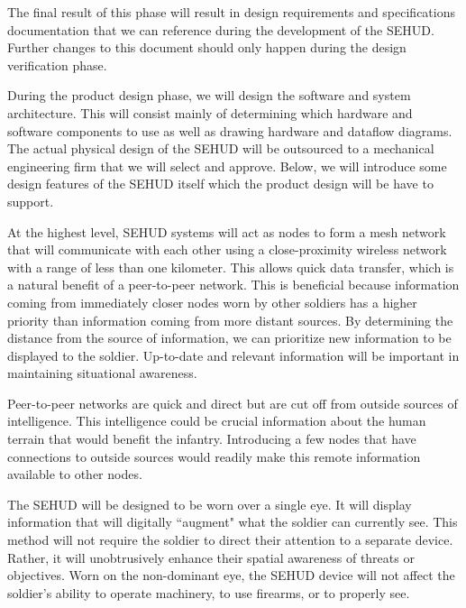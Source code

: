 The final result of this phase will result in design requirements and
specifications documentation that we can reference during the development of
the SEHUD. Further changes to this document should only happen during the
design verification phase.


During the product design phase, we will design the software and system
architecture. This will consist mainly of determining which hardware and
software components to use as well as drawing hardware and dataflow diagrams.
The actual physical design of the SEHUD will be outsourced to a mechanical
engineering firm that we will select and approve. Below, we will introduce
some design features of the SEHUD itself which the product design will be
have to support.

At the highest level, SEHUD systems will act as nodes to form a mesh network
that will communicate with each other using a close-proximity wireless
network with a range of less than one kilometer. This allows quick data
transfer, which is a natural benefit of a peer-to-peer network. This is
beneficial because information coming from immediately closer nodes worn by
other soldiers has a higher priority than information coming from more
distant sources. By determining the distance from the source of information,
we can prioritize new information to be displayed to the soldier. Up-to-date
and relevant information will be important in maintaining situational
awareness.

Peer-to-peer networks are quick and direct but are cut off from outside
sources of intelligence. This intelligence could be crucial information about
the human terrain that would benefit the infantry. Introducing a few nodes
that have connections to outside sources would readily make this remote
information available to other nodes.








The SEHUD will be designed to be worn over a single eye. It will display
information that will digitally ``augment" what the soldier can currently see.
This method will not require the soldier to direct their attention to a
separate device. Rather, it will unobtrusively enhance their spatial awareness
of threats or objectives. Worn on the non-dominant eye, the SEHUD device
will not affect the soldier's ability to operate machinery, to use firearms,
or to properly see.








